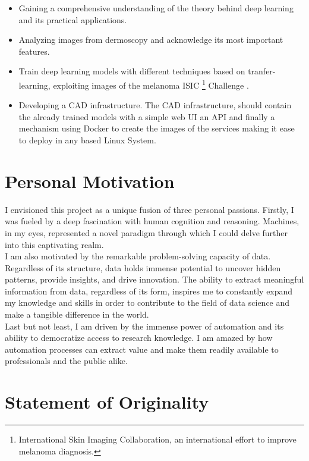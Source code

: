 \begin{itemize}
  \item Gaining a comprehensive understanding of the theory
    behind deep learning and its practical applications.
  \item Analyzing images
    from dermoscopy and acknowledge its most important features.
  \item Train
    deep learning models with different techniques based on tranfer-learning,
    exploiting images of the melanoma ISIC \footnote{International Skin Imaging
    Collaboration, an international effort to improve melanoma diagnosis.}
    Challenge \cite{IsicChallenge}.
  \item Developing a CAD infrastructure. The CAD infrastructure, should contain
    the already trained models with a simple web UI an API and finally a
    mechanism using Docker to create the images of the services making it ease
    to deploy in any based Linux System.
\end{itemize}

\section{Personal Motivation}

I envisioned this project as a unique fusion of three personal passions.
Firstly, I was fueled by a deep fascination with human cognition and reasoning.
Machines, in my eyes, represented a novel paradigm through which I could delve
further into this captivating realm. \\

I am also motivated by the remarkable problem-solving capacity of data.
Regardless of its structure, data holds immense potential to uncover hidden
patterns, provide insights, and drive innovation. The ability to extract
meaningful information from data, regardless of its form, inspires me to
constantly expand my knowledge and skills in order to contribute to the field
of data science and make a tangible difference in the world. \\

Last but not least, I am driven by the immense power of automation and its
ability to democratize access to research knowledge. I am amazed by how
automation processes can extract value and make them readily available to
professionals and the public alike.

\section{Statement of Originality}

